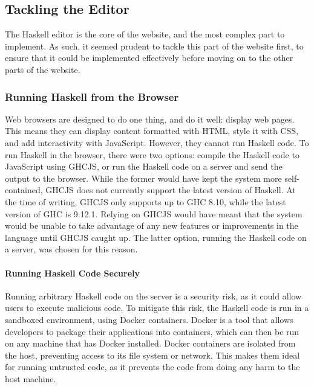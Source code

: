 \documentclass[../main.tex]{subfiles}
\begin{document}
        \subsection{Tackling the Editor}
            The Haskell editor is the core of the website, and the most complex part to
                implement.
            As such, it seemed prudent to tackle this part of the website first, to ensure
                that it could be implemented effectively before moving on to the other parts of
                the website.

            \subsubsection{Running Haskell from the Browser}
                Web browsers are designed to do one thing, and do it well: display web pages.
                This means they can display content formatted with HTML, style it with CSS, and
                    add interactivity with JavaScript.
                However, they cannot run Haskell code.
                To run Haskell in the browser, there were two options: compile the Haskell code
                    to JavaScript using GHCJS, or run the Haskell code on a server and send the
                    output to the browser.
                While the former would have kept the system more self-contained, GHCJS does not
                    currently support the latest version of Haskell.
                At the time of writing, GHCJS only supports up to GHC 8.10, while the latest
                    version of GHC is 9.12.1.
                Relying on GHCJS would have meant that the system would be unable to take
                    advantage of any new features or improvements in the language until GHCJS
                    caught up.
                The latter option, running the Haskell code on a server, was chosen for this
                    reason.

                \paragraph{Running Haskell Code Securely}
                    Running arbitrary Haskell code on the server is a security risk, as it could
                        allow users to execute malicious code.
                    To mitigate this risk, the Haskell code is run in a sandboxed environment,
                        using Docker containers.
                    Docker is a tool that allows developers to package their applications into
                        containers, which can then be run on any machine that has Docker installed.
                    Docker containers are isolated from the host, preventing access to its file
                        system or network.
                    This makes them ideal for running untrusted code, as it prevents the code from
                        doing any harm to the host machine.
\end{document}
